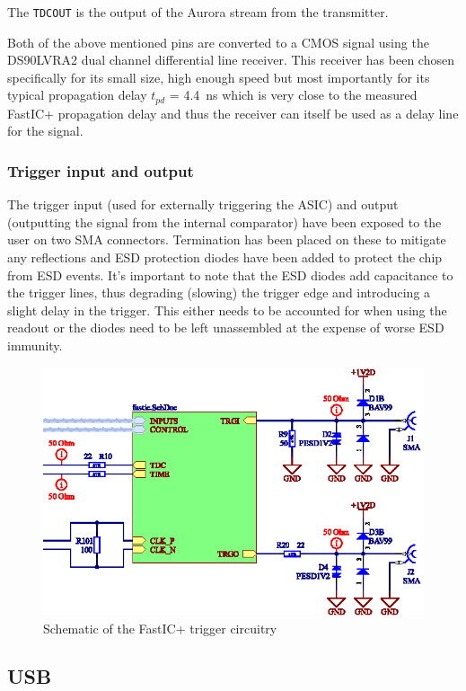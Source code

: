 \documentclass{cernatsnote}
\begin{document}
The \verb|TDCOUT| is the output of the Aurora stream from the transmitter.

Both of the above mentioned pins are converted to a CMOS signal using the DS90LVRA2 dual channel differential line receiver. This receiver has been chosen specifically for its small size, high enough speed but most importantly for its typical propagation delay $t_{pd}$ = \SI{4.4}{\nano\second} which is very close to the measured FastIC+ propagation delay and thus the receiver can itself be used as a delay line for the signal.

\subsubsection{Trigger input and output}
The trigger input (used for externally triggering the ASIC) and output (outputting the signal from the internal comparator) have been exposed to the user on two SMA connectors. Termination has been placed on these to mitigate any reflections and ESD protection diodes have been added to protect the chip from ESD events. It's important to note that the ESD diodes add capacitance to the trigger lines, thus degrading (slowing) the trigger edge and introducing a slight delay in the trigger. This either needs to be accounted for when using the readout or the diodes need to be left unassembled at the expense of worse ESD immunity. 
%
\FloatBarrier
\begin{figure}[htp!]
    \centering
    \includegraphics[scale=1.8]{schematic/fastic_top.eps}
    \caption{Schematic of the FastIC+ trigger circuitry}
    \label{fig:fastic_triggers}
\end{figure}

\subsection{USB}
\end{document}
